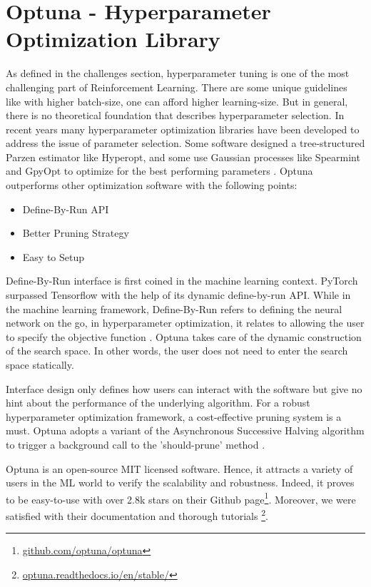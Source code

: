 \section{Optuna - Hyperparameter Optimization Library}

As defined in the challenges section, hyperparameter tuning is one of the most challenging part of Reinforcement Learning. There are some unique guidelines like with higher batch-size, one can afford higher learning-size. But in general, there is no theoretical foundation that describes hyperparameter selection. In recent years many hyperparameter optimization libraries have been developed to address the issue of parameter selection. Some software designed a tree-structured Parzen estimator like Hyperopt, and some use Gaussian processes like Spearmint and GpyOpt to optimize for the best performing parameters \cite{optuna_2019}. 
Optuna outperforms other optimization software with the following points:

\begin{itemize}
    \item Define-By-Run API 
    \item Better Pruning Strategy
    \item Easy to Setup
\end{itemize}

Define-By-Run interface is first coined in the machine learning context. PyTorch surpassed Tensorflow with the help of its dynamic define-by-run API. While in the machine learning framework, Define-By-Run refers to defining the neural network on the go, in hyperparameter optimization, it relates to allowing the user to specify the objective function \cite{optuna_2019}. Optuna takes care of the dynamic construction of the search space. In other words, the user does not need to enter the search space statically.

Interface design only defines how users can interact with the software but give no hint about the performance of the underlying algorithm. For a robust hyperparameter optimization framework, a cost-effective pruning system is a must. Optuna adopts a variant of the Asynchronous Successive Halving algorithm to trigger a background call to the 'should-prune' method \cite{Li2018}.

Optuna is an open-source MIT licensed software. Hence, it attracts a variety of users in the ML world to verify the scalability and robustness. Indeed, it proves to be easy-to-use with over 2.8k stars on their Github page\footnote{\url{github.com/optuna/optuna}}. Moreover, we were satisfied with their documentation and thorough tutorials \footnote{\url{optuna.readthedocs.io/en/stable/}}.

